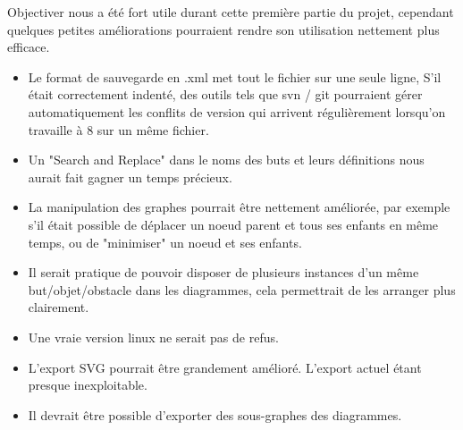 Objectiver nous a été fort utile durant cette première partie du projet,
cependant quelques petites améliorations pourraient rendre son utilisation
nettement plus efficace.

\begin{itemize}
	\item Le format de sauvegarde en .xml met tout le fichier sur une seule
	ligne, S'il était correctement indenté, des outils tels que svn / git
	pourraient gérer automatiquement les conflits de version qui arrivent
	régulièrement lorsqu'on travaille à 8 sur un même fichier.
	
	\item Un "Search and Replace" dans le noms des buts et leurs définitions
	nous aurait fait gagner un temps précieux. 

	\item La manipulation des graphes pourrait être nettement améliorée,
	par exemple s'il était possible de déplacer un noeud parent et tous ses
	enfants en même temps, ou de "minimiser" un noeud et ses enfants. 

	\item Il serait pratique de pouvoir disposer de plusieurs instances d'un
	même but/objet/obstacle dans les diagrammes, cela permettrait de les 
	arranger plus clairement.

	\item Une vraie version linux ne serait pas de refus.
	
	\item L'export SVG pourrait être grandement amélioré. L'export actuel
	étant presque inexploitable.
	
	\item Il devrait être possible d'exporter des sous-graphes des diagrammes.
\end{itemize}
